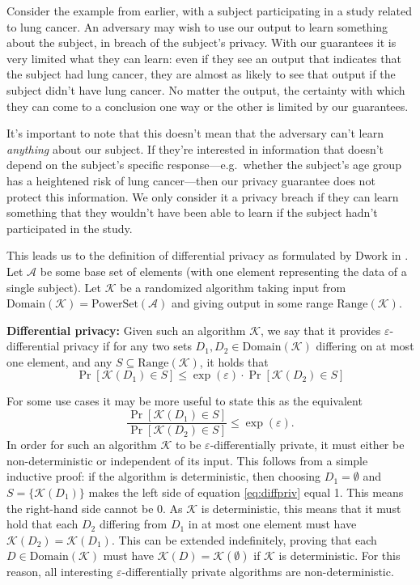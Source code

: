 \documentclass[a4paper,12pt]{article}
\newcommand{\fancy}{\mathcal}
\renewcommand{\epsilon}{\varepsilon}
\begin{document}
Consider the example from earlier, with a subject participating in a study related to lung cancer. An adversary may wish to use our output to learn something about the subject, in breach of the subject's privacy. With our guarantees it is very limited what they can learn: even if they see an output that indicates that the subject had lung cancer, they are almost as likely to see that output if the subject didn't have lung cancer. No matter the output, the certainty with which they can come to a conclusion one way or the other is limited by our guarantees.

It's important to note that this doesn't mean that the adversary can't learn \emph{anything} about our subject. If they're interested in information that doesn't depend on the subject's specific response---e.g.\ whether the subject's age group has a heightened risk of lung cancer---then our privacy guarantee does not protect this information. We only consider it a privacy breach if they can learn something that they wouldn't have been able to learn if the subject hadn't participated in the study. 


This leads us to the definition of differential privacy as formulated by Dwork in \cite{dwork2006_diffpriv}. Let $\fancy{A}$ be some base set of elements (with one element representing the data of a single subject). Let $\fancy{K}$ be a randomized algorithm taking input from $\text{Domain}(\fancy{K})=\text{PowerSet}(\fancy{A})$ and giving output in some range $\text{Range}(\fancy{K})$.

\begin{mdframed}
    \textbf{Differential privacy:} Given such an algorithm $\fancy{K}$, we say that it provides $\epsilon$-differential privacy if for any two sets $D_1,D_2 \in \text{Domain}(\fancy{K})$ differing on at most one element, and any $S \subseteq \text{Range}(\fancy{K})$, it holds that
    \begin{equation}\label{eq:diffpriv}
        \Pr[\fancy{K}(D_1) \in S] \leq \exp(\epsilon) \cdot \Pr[\fancy{K}(D_2) \in S]
    \end{equation}
\end{mdframed}

For some use cases it may be more useful to state this as the equivalent
\begin{equation*}
    \frac{\Pr[\fancy{K}(D_1) \in S]}{\Pr[\fancy{K}(D_2) \in S]} \leq \exp(\epsilon).
\end{equation*}
In order for such an algorithm $\fancy{K}$ to be $\epsilon$-differentially private, it must either be non-deterministic or independent of its input. This follows from a simple inductive proof: if the algorithm is deterministic, then choosing $D_1=\emptyset$ and $S=\{ \fancy{K}(D_1) \}$ makes the left side of equation \ref{eq:diffpriv} equal 1. This means the right-hand side cannot be 0. As $\fancy{K}$ is deterministic, this means that it must hold that each $D_2$ differing from $D_1$ in at most one element must have $\fancy{K}(D_2)=\fancy{K}(D_1)$. This can be extended indefinitely, proving that each $D \in \text{Domain}(\fancy{K})$ must have $\fancy{K}(D)=\fancy{K}(\emptyset)$ if $\fancy{K}$ is deterministic. For this reason, all interesting $\epsilon$-differentially private algorithms are non-deterministic. 
\end{document}
